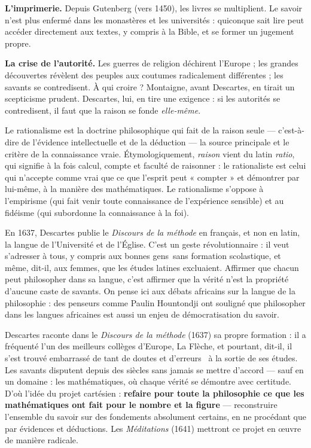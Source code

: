 \documentclass[11pt]{article}
\newcommand{\cle}[1]{{\popxbold\color{popdark}#1}}
\newcounter{popsec}
\newcounter{popsub}
\newcommand{\courssub}[1]{%
  \stepcounter{popsub}%
  \par\vspace{9pt}\noindent{\popxbold\fontsize{11.5}{13}\selectfont\color{popink}{\color{poporange}\thepopsec.\thepopsub}\hspace{6pt}#1}\par\nopagebreak\vspace{4pt}
}
\begin{document}
\textbf{L'imprimerie.} Depuis Gutenberg (vers 1450), les livres se multiplient. Le savoir n'est plus enfermé dans les monastères et les universités : quiconque sait lire peut accéder directement aux textes, y compris à la Bible, et se former un jugement propre.

\textbf{La crise de l'autorité.} Les guerres de religion déchirent l'Europe ; les grandes découvertes révèlent des peuples aux coutumes radicalement différentes ; les savants se contredisent. À qui croire ? Montaigne, avant Descartes, en tirait un scepticisme prudent. Descartes, lui, en tire une exigence : si les autorités se contredisent, il faut que la raison se fonde \emph{elle-même}.

\begin{definition}[Le rationalisme]
Le \cle{rationalisme} est la doctrine philosophique qui fait de la \cle{raison} seule — c'est-à-dire de l'évidence intellectuelle et de la déduction — la source principale et le critère de la connaissance vraie. Étymologiquement, \emph{raison} vient du latin \emph{ratio}, qui signifie à la fois calcul, compte et faculté de raisonner : le rationaliste est celui qui n'accepte comme vrai que ce que l'esprit peut « compter » et démontrer par lui-même, à la manière des mathématiques. Le rationalisme s'oppose à l'\cle{empirisme} (qui fait venir toute connaissance de l'expérience sensible) et au \cle{fidéisme} (qui subordonne la connaissance à la foi).
\end{definition}

\begin{savaistu}
En 1637, Descartes publie le \emph{Discours de la méthode} en français, et non en latin, la langue de l'Université et de l'Église. C'est un geste révolutionnaire : il veut s'adresser à tous, y compris aux \guillemotleft bonnes gens\guillemotright\ sans formation scolastique, et même, dit-il, aux femmes, que les études latines excluaient. Affirmer que chacun peut philosopher dans sa langue, c'est affirmer que la vérité n'est la propriété d'aucune caste de savants. On pense ici aux débats africains sur la langue de la philosophie : des penseurs comme Paulin Hountondji ont souligné que philosopher dans les langues africaines est aussi un enjeu de démocratisation du savoir.
\end{savaistu}

\courssub{Le projet cartésien : reconstruire tout le savoir}

Descartes raconte dans le \emph{Discours de la méthode} (1637) sa propre formation : il a fréquenté l'un des meilleurs collèges d'Europe, La Flèche, et pourtant, dit-il, il s'est trouvé \guillemotleft embarrassé de tant de doutes et d'erreurs \guillemotright\ à la sortie de ses études. Les savants disputent depuis des siècles sans jamais se mettre d'accord — sauf en un domaine : les mathématiques, où chaque vérité se démontre avec certitude. D'où l'idée du projet cartésien : \textbf{refaire pour toute la philosophie ce que les mathématiques ont fait pour le nombre et la figure} — reconstruire l'ensemble du savoir sur des fondements absolument certains, en ne procédant que par évidences et déductions. Les \emph{Méditations} (1641) mettront ce projet en œuvre de manière radicale.
\end{document}
